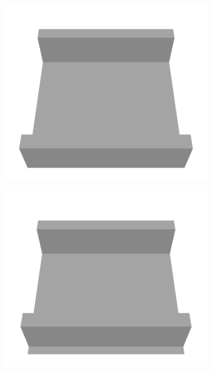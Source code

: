 \documentclass[../document.tex]{subfiles}
\begin{document}
\begin{figure} [htbp]
    \centering
    \begin{subfigure}[b]{0.24\textwidth}
    \includegraphics[width=\linewidth]{../img/5/custom_patches/tunnel/all/00-3d.png}
    \end{subfigure}
    \begin{subfigure}[b]{0.24\textwidth}
    \includegraphics[width=\linewidth]{../img/5/custom_patches/tunnel/all/04-3d.png}
    \end{subfigure}

\end{figure}
\end{document}
